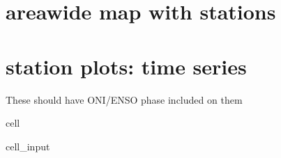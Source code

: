 \documentclass[letterpaper,10pt,english]{jupyterBook}
\begin{document}
\section{area\sphinxhyphen{}wide map with stations}
\label{\detokenize{notebooks/regional_and_local/SL_anomaly_annual:area-wide-map-with-stations}}

\section{station plots: time series}
\label{\detokenize{notebooks/regional_and_local/SL_anomaly_annual:station-plots-time-series}}
\sphinxAtStartPar
These should have ONI/ENSO phase included on them

\begin{sphinxuseclass}{cell}\begin{sphinxVerbatimInput}

\begin{sphinxuseclass}{cell_input}
\begin{sphinxVerbatim}[commandchars=\\\{\}]
       

     
     


\end{sphinxVerbatim}
\end{sphinxuseclass}
\end{sphinxVerbatimInput}
\end{sphinxuseclass}
\end{document}
